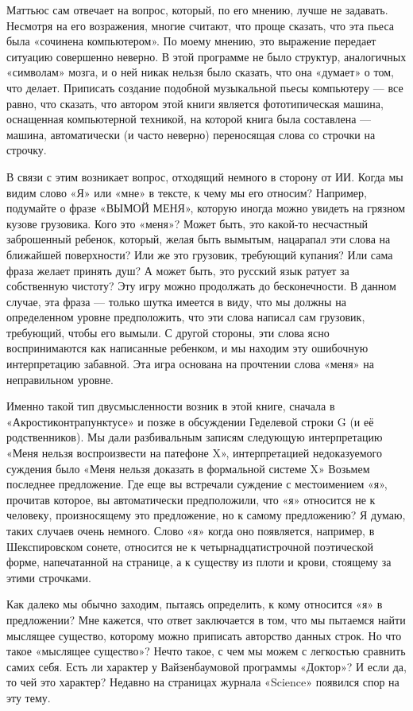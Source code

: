 \documentclass[../main.tex]{subfiles}
\begin{document}
Маттьюс сам отвечает на вопрос, который, по его мнению, лучше не задавать. Несмотря на его возражения, многие считают, что проще сказать, что эта пьеса была «сочинена компьютером». По моему мнению, это выражение передает ситуацию совершенно неверно. В этой программе не было структур, аналогичных «символам» мозга, и о ней никак нельзя было сказать, что она «думает» о том, что делает. Приписать создание подобной музыкальной пьесы компьютеру --- все равно, что сказать, что автором этой книги является фототипическая машина, оснащенная компьютерной техникой, на которой книга была составлена --- машина, автоматически (и часто неверно) переносящая слова со строчки на строчку.

В связи с этим возникает вопрос, отходящий немного в сторону от ИИ\@. Когда мы видим слово «Я» или «мне» в тексте, к чему мы его относим? Например, подумайте о фразе «ВЫМОЙ МЕНЯ», которую иногда можно увидеть на грязном кузове грузовика. Кого это «меня»? Может быть, это какой-то несчастный заброшенный ребенок, который, желая быть вымытым, нацарапал эти слова на ближайшей поверхности? Или же это грузовик, требующий купания? Или сама фраза желает принять душ? А может быть, это русский язык ратует за собственную чистоту? Эту игру можно продолжать до бесконечности. В данном случае, эта фраза --- только шутка имеется в виду, что мы должны на определенном уровне предположить, что эти слова написал сам грузовик, требующий, чтобы его вымыли. С другой стороны, эти слова ясно воспринимаются как написанные ребенком, и мы находим эту ошибочную интерпретацию забавной. Эта игра основана на прочтении слова «меня» на неправильном уровне.

Именно такой тип двусмысленности возник в этой книге, сначала в «Акростиконтрапунктусе» и позже в обсуждении Геделевой строки G (и её родственников). Мы дали разбивальным записям следующую интерпретацию «Меня нельзя воспроизвести на патефоне X», интерпретацией недоказуемого суждения было «Меня нельзя доказать в формальной системе X» Возьмем последнее предложение. Где еще вы встречали суждение с местоимением «я», прочитав которое, вы автоматически предположили, что «я» относится не к человеку, произносящему это предложение, но к самому предложению? Я думаю, таких случаев очень немного. Слово «я» когда оно появляется, например, в Шекспировском сонете, относится не к четырнадцатистрочной поэтической форме, напечатанной на странице, а к существу из плоти и крови, стоящему за этими строчками.

Как далеко мы обычно заходим, пытаясь определить, к кому относится «я» в предложении? Мне кажется, что ответ заключается в том, что мы пытаемся найти мыслящее существо, которому можно приписать авторство данных строк. Но что такое «мыслящее существо»? Нечто такое, с чем мы можем с легкостью сравнить самих себя. Есть ли характер у Вайзенбаумовой программы «Доктор»? И если да, то чей это характер? Недавно на страницах журнала «Science» появился спор на эту тему.
\end{document}
